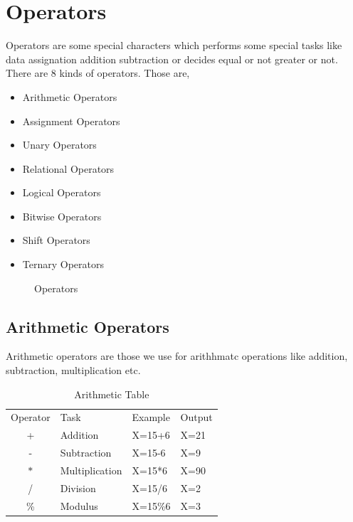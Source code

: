 \documentclass[openany]{book}  %
\begin{document}
\chapter{Operators}
Operators\cite{Ref8} are some special characters which performs some special tasks like data assignation addition subtraction or decides equal or not greater or not.
There are 8 kinds of operators. Those are,
\begin{itemize}
    \item Arithmetic Operators
    \item Assignment Operators
    \item Unary Operators
    \item Relational Operators
    \item Logical Operators
    \item Bitwise Operators
    \item Shift Operators
    \item Ternary Operators
\end{itemize}
% 
%
\begin{figure}[htbp]
    \begin{center}
        \caption{Operators\cite{Ref8}}
    \end{center}
\end{figure}
% 
% 
\section{Arithmetic Operators}
Arithmetic operators\cite{Ref8} are those we use for arithhmatc operations like addition, subtraction, multiplication etc.
% 
% 
\begin{table}[htbp]
    \begin{tabular}{clll}
        \multicolumn{1}{l}{Operator} & Task           & Example & Output \\
        +                            & Addition       & X=15+6  & X=21   \\
        -                            & Subtraction    & X=15-6  & X=9    \\
        $*$                          & Multiplication & X=15*6  & X=90   \\
        /                            & Division       & X=15/6  & X=2    \\
        \%                           & Modulus        & X=15\%6 & X=3
    \end{tabular}
    \centering
    \caption{Arithmetic Table}
\end{table}
% 
% 
\end{document}
